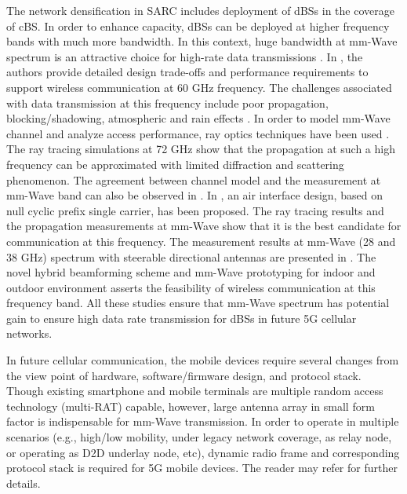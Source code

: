 \documentclass[article,10pt,twocolumn]{IEEEtran}
\begin{document}
The network densification in SARC includes deployment of dBSs in the coverage of cBS. In order to enhance capacity, dBSs can be deployed at higher frequency bands with much more bandwidth. In this context, huge bandwidth at mm-Wave spectrum is an attractive choice for high-rate data transmissions \citep{6732923}. In \citep{4457895}, the authors provide detailed design trade-offs and performance requirements to support wireless communication at 60 GHz frequency. The challenges associated with data transmission at this frequency include poor propagation, blocking/shadowing, atmospheric and rain effects \citep{1491267,6824752}. In order to model mm-Wave channel and analyze access performance, ray optics techniques have been used \citep{6134693}. The ray tracing simulations at 72 GHz show that the propagation at such a high frequency can be approximated with limited diffraction and scattering phenomenon. The agreement between channel model and the measurement at mm-Wave band can also be observed in \citep{6253227}. In \citep{6824972}, an air interface design, based on null cyclic prefix single carrier, has been proposed. The ray tracing results and the propagation measurements at mm-Wave show that it is the best candidate for communication at this frequency. The measurement results at mm-Wave (28 and 38 GHz) spectrum with steerable directional antennas are presented in \citep{6515173}. The novel hybrid beamforming scheme and mm-Wave prototyping for indoor and outdoor environment \citep{6736750} asserts the feasibility of wireless communication at this frequency band. All these studies ensure that mm-Wave spectrum has potential gain to ensure high data rate transmission for dBSs in future 5G cellular networks.

In future cellular communication, the mobile devices require several changes from the view point of hardware, software/firmware design, and protocol stack. Though existing smartphone and mobile terminals are multiple random access technology (multi-RAT) capable, however, large antenna array in small form factor is indispensable for mm-Wave transmission. In order to operate in multiple scenarios (e.g., high/low mobility, under legacy network coverage, as relay node, or operating as D2D underlay node, etc), dynamic radio frame and corresponding protocol stack is required for 5G mobile devices. The reader may refer \citep{4784727,tudzarov_protocols_2011} for further details.
\end{document}
